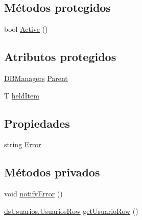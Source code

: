 \subsection*{Métodos protegidos}
\begin{DoxyCompactItemize}
\item 
bool \hyperlink{class_proyecto___integrador__3_1_1_d_b_managers_1_1_d_b_manager_3_01_t_01_4_add66e324cef43fd10b491bc697fa60b5}{Active} ()
\end{DoxyCompactItemize}
\subsection*{Atributos protegidos}
\begin{DoxyCompactItemize}
\item 
\hyperlink{class_proyecto___integrador__3_1_1_d_b_managers}{D\-B\-Managers} \hyperlink{class_proyecto___integrador__3_1_1_d_b_managers_1_1_d_b_manager_3_01_t_01_4_a06315e75298c8f2fd46f32dc7c9a80b2}{Parent}
\item 
T \hyperlink{class_proyecto___integrador__3_1_1_d_b_managers_1_1_d_b_manager_3_01_t_01_4_a3b67ae3b5b3b9c3793d56c1407d7dcff}{held\-Item}
\end{DoxyCompactItemize}
\subsection*{Propiedades}
\begin{DoxyCompactItemize}
\item 
string \hyperlink{class_proyecto___integrador__3_1_1_d_b_managers_1_1_d_b_manager_3_01_t_01_4_a6e5caaed2ee1a4d067dfbf5aaa1b1fa8}{Error}
\end{DoxyCompactItemize}
\subsection*{Métodos privados}
\begin{DoxyCompactItemize}
\item 
void \hyperlink{class_proyecto___integrador__3_1_1_d_b_managers_1_1_usuario_d_b_manager_a6d2db3445fc5acc8a349b76029714a96}{notify\-Error} ()
\item 
\hyperlink{class_proyecto___integrador__3_1_1ds_usuarios_1_1_usuarios_row}{ds\-Usuarios.\-Usuarios\-Row} \hyperlink{class_proyecto___integrador__3_1_1_d_b_managers_1_1_usuario_d_b_manager_a4e531d5e782e81b5a70ce977fef09cf4}{get\-Usuario\-Row} ()
\end{DoxyCompactItemize}


